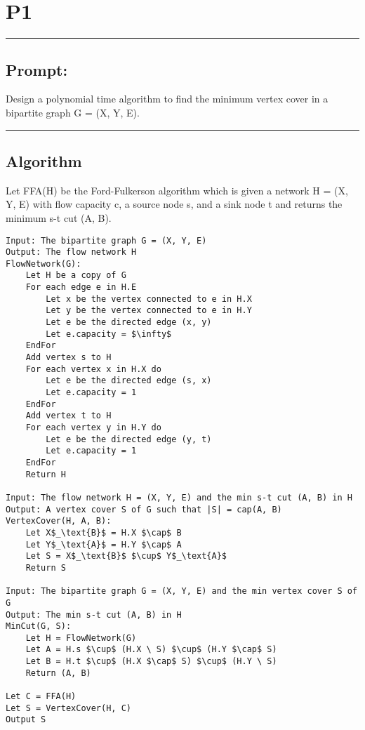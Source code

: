 \documentclass[11pt]{article}
\title{}
\author{}
\date{}
\begin{document}
\section*{P1}

\noindent\textcolor[RGB]{220,220,220}{\rule{\linewidth}{0.8pt}}

\subsection*{Prompt:} 

Design a polynomial time algorithm to find the minimum vertex cover in a bipartite graph G = (X, Y, E).

\noindent\textcolor[RGB]{220,220,220}{\rule{\linewidth}{0.8pt}}

\subsection*{Algorithm}

Let FFA(H) be the Ford-Fulkerson algorithm which is given a network H = (X, Y, E) with flow capacity c, a source node s, and a sink node t and returns the minimum s-t 
cut (A, B).

\begin{lstlisting}[basicstyle=\small, mathescape=true]
Input: The bipartite graph G = (X, Y, E)
Output: The flow network H
FlowNetwork(G):
	Let H be a copy of G
	For each edge e in H.E
		Let x be the vertex connected to e in H.X
		Let y be the vertex connected to e in H.Y
		Let e be the directed edge (x, y)
		Let e.capacity = $\infty$
	EndFor	
	Add vertex s to H
	For each vertex x in H.X do
		Let e be the directed edge (s, x)
		Let e.capacity = 1
	EndFor
	Add vertex t to H
	For each vertex y in H.Y do
		Let e be the directed edge (y, t)
		Let e.capacity = 1
	EndFor
	Return H
	
Input: The flow network H = (X, Y, E) and the min s-t cut (A, B) in H
Output: A vertex cover S of G such that |S| = cap(A, B)
VertexCover(H, A, B):
	Let X$_\text{B}$ = H.X $\cap$ B
	Let Y$_\text{A}$ = H.Y $\cap$ A
	Let S = X$_\text{B}$ $\cup$ Y$_\text{A}$
	Return S
	
Input: The bipartite graph G = (X, Y, E) and the min vertex cover S of G
Output: The min s-t cut (A, B) in H
MinCut(G, S):
	Let H = FlowNetwork(G)
	Let A = H.s $\cup$ (H.X \ S) $\cup$ (H.Y $\cap$ S)
	Let B = H.t $\cup$ (H.X $\cap$ S) $\cup$ (H.Y \ S)
	Return (A, B)

Let C = FFA(H)
Let S = VertexCover(H, C)
Output S
\end{lstlisting}
\end{document}
